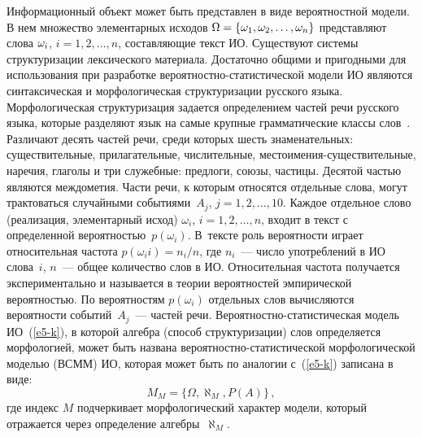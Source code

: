 \begin{multicols}{2}
   Информационный объект может быть пред\-став\-лен в виде вероятностной 
модели. В нем множество элементарных исходов $\Omega = \{\omega_1, \omega_2, 
\ldots , \omega_n\}$ представляют слова $\omega_i$, $i=1, 2, \ldots , n$, со\-став\-ля\-ющие 
текст ИО. Существуют системы структуризации лексического материала. 
Достаточно общими и пригодными для использования при разработке 
ве\-ро\-ят\-но\-ст\-но-ста\-ти\-сти\-че\-ской модели ИО являются синтаксическая и 
морфологическая структуризации русского языка. Морфологическая 
структуризация задается определением частей речи русского языка, которые 
разделяют язык на самые крупные грамматические классы слов~\cite{8-k}. 
Различают десять частей речи, среди которых шесть знаменательных: 
существительные, прилагательные, чис\-ли\-тель\-ные, 
   мес\-то\-име\-ния-су\-ще\-ст\-ви\-тель\-ные, наречия, глаголы и три 
служебные: предлоги, союзы, частицы. Десятой частью являются 
междометия. Части речи, к которым относятся отдельные слова, могут 
трактоваться случайными событиями~$A_j$, $j = 1, 2, \ldots , 10$. Каждое 
отдельное слово (реализация, элементарный исход) $\omega_i$, $i=1, 2, \ldots 
, n$, входит в текст с определенной вероятностью~$p(\omega_i)$. В~тексте 
роль вероятности играет относительная частота $p(\omega_ii)=n_i/n$, где 
$n_i$~--- число употреблений в ИО слова~$i$, $n$~--- общее количество слов 
в ИО. Относительная частота получается экспериментально и называется в 
теории вероятностей эмпирической вероятностью. По вероятностям 
$p(\omega_i)$ отдельных слов вычисляются вероятности событий~$A_j$~--- 
час\-тей речи. Вероятностно-статистическая модель ИО~(\ref{e5-k}), в которой 
алгебра (способ структуризации) слов определяется морфологией, может 
быть названа вероятностно-статистической морфологической моделью 
(ВСММ) ИО, которая может быть по аналогии с~(\ref{e5-k}) записана в виде: 
   \begin{equation}
   M_M =\{\Omega, \aleph_M, P(A)\}\,,
   \label{e6-k}
   \end{equation}
где индекс $M$ подчеркивает морфологический характер модели, который 
отражается через определение алгебры~$\aleph_M$.
   

\end{multicols}
